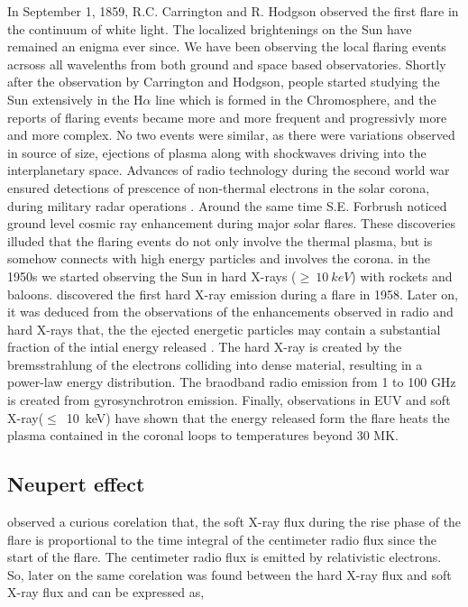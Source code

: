 In September 1, 1859, R.C. Carrington and R. Hodgson observed the first flare in the continuum of white light\citep{carrington1859,hodgson1859}. The localized brightenings on the Sun have remained an enigma ever since. We have been observing the local flaring events acrsoss all wavelenths from both ground and space based observatories.  Shortly after the observation by Carrington and Hodgson, people started studying the Sun extensively in the H$\alpha$ line which is formed in the Chromosphere, and the reports of flaring events became more and more frequent and progressivly more and more complex. No two events were similar, as there were variations observed in source of size, ejections of plasma along with shockwaves driving into the interplanetary space. Advances of radio technology during the second world war ensured detections of prescence of non-thermal electrons in the solar corona, during military radar operations \citep{hey46}. Around the same time S.E. Forbrush noticed ground level cosmic ray enhancement during major solar flares. These discoveries illuded that the flaring events do not only involve the thermal plasma, but is somehow connects with high energy particles and involves the corona. in the 1950s we started observing the Sun in hard X-rays ($\ge~10~keV$) with rockets and baloons. \cite{peterson59} discovered the first hard X-ray emission during a flare in 1958. Later on, it was deduced from the observations of the enhancements observed in radio and hard X-rays that, the the ejected energetic particles may contain a substantial fraction of the intial energy released \citep{brown71}. The hard X-ray is created by the bremsstrahlung of the electrons colliding into dense material, resulting in a power-law energy distribution. The braodband radio emission from 1 to 100 GHz is created from gyrosynchrotron emission. Finally, observations in EUV and soft X-ray($\le$~10~keV) have shown that the energy released form the flare heats the plasma contained in the coronal loops to temperatures beyond 30 MK. 

\subsection{Neupert effect}\label{npt_eff}

\cite{neupert68} observed a curious corelation that, the soft X-ray flux during the rise phase of the flare is proportional to the time integral of the centimeter radio flux since the start of the flare. The centimeter radio flux is emitted by relativistic electrons. So, later on the same corelation was found between the hard X-ray flux and soft X-ray flux and can be expressed as,

